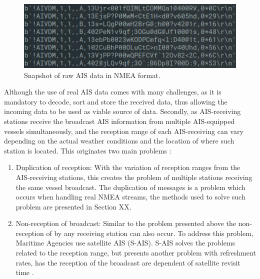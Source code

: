 \begin{figure}[H]
\centering
\includegraphics[scale = .5]{figures/Ch3/NMEAexample.png}
\caption{Snapshot of raw AIS data in NMEA format.}
\label{fig:NMEAexample}
\end{figure}
Although the use of real AIS data comes with many challenges, as it is mandatory to decode, sort and store the received data, thus allowing the incoming data to be used as viable source of data. Secondly, as AIS-receiving stations receive the broadcast AIS information from multiple AIS-equipped vessels simultaneously, and the reception range of each AIS-receiving can vary depending on the actual weather conditions and the location of where such station is located. This originates two main problems :
\begin{enumerate}
\item Duplication of reception:  With the variation of reception ranges from the AIS-receiving stations, this creates the problem of multiple stations receiving the same vessel broadcast. The duplication of messages is a problem which occurs when handling real NMEA streams, the methods used to solve such problem are presented in Section XX.

\item Non-reception of broadcast: Similar to the problem presented above the non-reception of by any receiving station can also occur. To address this problem, Maritime Agencies use satellite AIS (S-AIS). S-AIS solves the problems related to the reception range, but presents another problem with refreshment rates, has the reception of the broadcast are dependent of satellite revisit time \cite{Robards2016ConservationReview}. 
\end{enumerate}




